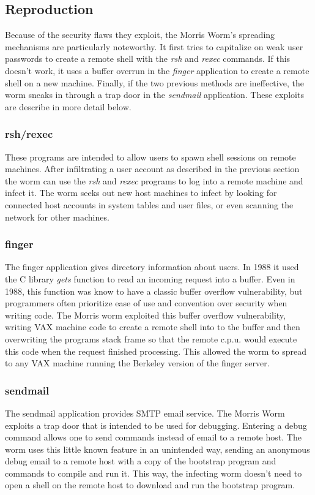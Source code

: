 \subsection*{Reproduction}
Because of the security flaws they exploit, the Morris Worm's spreading
mechanisms are particularly noteworthy. It first tries to capitalize on weak
user passwords to create a remote shell with the \textit{rsh} and \textit{rexec}
commands. If this doesn't work, it uses a buffer overrun in the \textit{finger}
application to create a remote shell on a new machine. Finally, if the two
previous methods are ineffective, the worm sneaks in through a trap door in the
\textit{sendmail} application. These exploits are describe in more detail below. 
\subsubsection*{rsh/rexec}
These programs are intended to allow users to spawn shell sessions on remote
machines. After infiltrating a user account as described in the previous
section the worm can use the \textit{rsh} and \textit{rexec} programs to log
into a remote machine and infect it. The worm seeks out new host machines to
infect by looking for connected host accounts in
system tables and user files, or even scanning the network for other machines.

\subsubsection*{finger}
The finger application gives directory information about users. In 1988 it used
the C library \textit{gets} function to read an incoming request into a buffer.
Even in 1988, this function was know to have a classic buffer overflow vulnerability, but
programmers often prioritize ease of use and convention over security when
writing code. The Morris worm exploited this buffer overflow vulnerability,
writing VAX machine code to create a remote shell into to the buffer and then
overwriting the programs stack frame so that the remote c.p.u. would execute
this code when the request finished processing. This allowed the worm to spread
to any VAX machine running the Berkeley version of the finger server.

\subsubsection*{sendmail}
The sendmail application provides SMTP email service. The Morris Worm exploits
a trap door that is intended to be used for debugging. Entering a debug command
allows one to send commands instead of email to a remote host. The worm uses
this little known feature in an unintended way, sending an anonymous debug email
to a remote host with a copy of the bootstrap program and commands to compile and run
it. This way, the infecting worm doesn't need to open a shell on the remote host
to download and run the bootstrap program.


